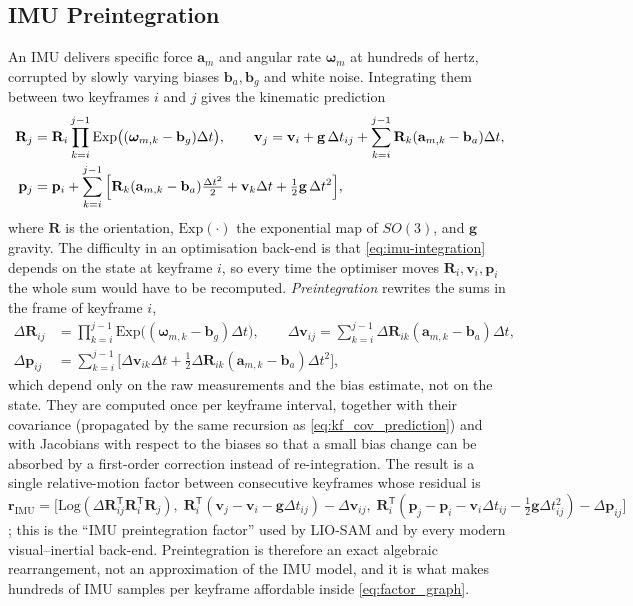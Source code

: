 \subsection{IMU Preintegration}
\label{subsec:imu-preintegration}
An IMU delivers specific force $\mathbf{a}_m$ and angular rate $\boldsymbol{\omega}_m$ at hundreds of hertz, corrupted by slowly varying biases $\mathbf{b}_a,\mathbf{b}_g$ and white noise. Integrating them between two keyframes $i$ and $j$ gives the kinematic prediction
\begin{align}
\mathbf{R}_j&=\mathbf{R}_i\prod_{k=i}^{j-1}\mathrm{Exp}\big((\boldsymbol{\omega}_{m,k}-\mathbf{b}_g)\Delta t\big),\qquad
\mathbf{v}_j=\mathbf{v}_i+\mathbf{g}\,\Delta t_{ij}+\sum_{k=i}^{j-1}\mathbf{R}_k(\mathbf{a}_{m,k}-\mathbf{b}_a)\Delta t,\nonumber\\
\mathbf{p}_j&=\mathbf{p}_i\deletedmath{+\mathbf{v}_i\Delta t_{ij}+\tfrac12\mathbf{g}\,\Delta t_{ij}^{2}}+\sum_{k=i}^{j-1}\Big[\mathbf{R}_k(\mathbf{a}_{m,k}-\mathbf{b}_a)\tfrac{\Delta t^{2}}{2}+\mathbf{v}_k\Delta t\added{+\tfrac12\mathbf{g}\,\Delta t^{2}}\Big],
\label{eq:imu-integration}
\end{align}
where $\mathbf{R}$ is the orientation, $\mathrm{Exp}(\cdot)$ the exponential map of $SO(3)$, and $\mathbf{g}$ gravity. The difficulty in an optimisation back-end is that \eqref{eq:imu-integration} depends on the state at keyframe $i$, so every time the optimiser moves $\mathbf{R}_i,\mathbf{v}_i,\mathbf{p}_i$ the whole sum would have to be recomputed. \emph{Preintegration} \cite{forster2017_preintegration} rewrites the sums in the frame of keyframe $i$,
\begin{align}
\Delta\mathbf{R}_{ij}&=\prod_{k=i}^{j-1}\mathrm{Exp}\big((\boldsymbol{\omega}_{m,k}-\mathbf{b}_g)\Delta t\big),\qquad
\Delta\mathbf{v}_{ij}=\sum_{k=i}^{j-1}\Delta\mathbf{R}_{ik}(\mathbf{a}_{m,k}-\mathbf{b}_a)\Delta t,\nonumber\\
\Delta\mathbf{p}_{ij}&=\sum_{k=i}^{j-1}\Big[\Delta\mathbf{v}_{ik}\Delta t+\tfrac12\Delta\mathbf{R}_{ik}(\mathbf{a}_{m,k}-\mathbf{b}_a)\Delta t^{2}\Big],
\label{eq:imu-preintegration}
\end{align}
which depend only on the raw measurements and the bias estimate, not on the state. They are computed once per keyframe interval, together with their covariance (propagated by the same recursion as \eqref{eq:kf_cov_prediction}) and with Jacobians with respect to the biases so that a small bias change can be absorbed by a first-order correction instead of re-integration. The result is a single relative-motion factor between consecutive keyframes whose residual is $\mathbf{r}_{\mathrm{IMU}}=\big[\mathrm{Log}(\Delta\mathbf{R}_{ij}^{\mathsf T}\mathbf{R}_i^{\mathsf T}\mathbf{R}_j),\;\mathbf{R}_i^{\mathsf T}(\mathbf{v}_j-\mathbf{v}_i-\mathbf{g}\Delta t_{ij})-\Delta\mathbf{v}_{ij},\;\mathbf{R}_i^{\mathsf T}(\mathbf{p}_j-\mathbf{p}_i-\mathbf{v}_i\Delta t_{ij}-\tfrac12\mathbf{g}\Delta t_{ij}^{2})-\Delta\mathbf{p}_{ij}\big]$; this is the ``IMU preintegration factor'' used by LIO-SAM \cite{shan2020_liosam} and by every modern visual--inertial back-end. Preintegration is therefore an exact algebraic rearrangement, not an approximation of the IMU model, and it is what makes hundreds of IMU samples per keyframe affordable inside \eqref{eq:factor_graph}.

